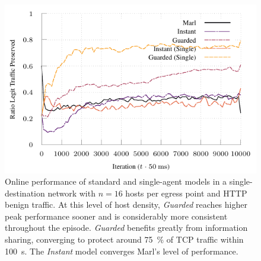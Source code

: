\documentclass[10pt, times, comsoc]{IEEEtran}
\begin{document}
\begin{figure}
	\centering
	\includegraphics[width=0.95\linewidth]{../plots/tnsm-tcp-16-single}
	
	\caption{
		Online performance of standard and single-agent models in a single-destination network with $n=16$ hosts per egress point and HTTP benign traffic.
		At this level of host density, \emph{Guarded} reaches higher peak performance sooner and is considerably more consistent throughout the episode.
		\emph{Guarded} benefits greatly from information sharing, converging to protect around \SI{75}{\percent} of TCP traffic within \SI{100}{\second}.
		The \emph{Instant} model converges Marl's level of performance.
		\label{fig:tcp-tree-16}
	}
\end{figure}

%	

%	
\end{document}
